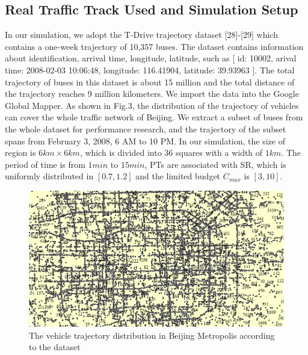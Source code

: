 \documentclass[journal]{IEEEtran}
\begin{document}
\subsection{Real Traffic Track Used and Simulation Setup}
In our simulation, we adopt the T-Drive trajectory dataset [28]-[29] which contains a one-week trajectory of 10,357 buses. The dataset contains information about identification, arrival time, longitude, latitude, such as [ id: 10002, arival time: 2008-02-03 10:06:48, longitude: 116.41904, latitude: 39.93963 ]. The total trajectory of buses in this dataset is about 15 million and the total distance of the trajectory reaches 9 million kilometers. We import the data into the Google Global Mapper. As shown in Fig.3, the distribution of the trajectory of vehicles can cover the whole traffic network of Beijing. We extract a subset of buses from the whole dataset for performance research, and the trajectory of the subset spans from February 3, 2008, 6 AM to 10 PM. In our simulation, the size of region is $6km\times 6km$, which is divided into 36 squares with a width of $1km$. The period of time is from $1min$ to $15min$, PTs are associated with SR, which is uniformly distributed in $[0.7, 1.2]$ and the limited budget $C_{max}$ is $[3, 10]$. 
\begin{figure}
	\centering
	\includegraphics[width=0.85\linewidth]{fig3-1.png}
	\caption{The vehicle trajectory distribution in Beijing Metropolis according to the dataset}
	\label{fig:figure4}
\end{figure} 
\end{document}
